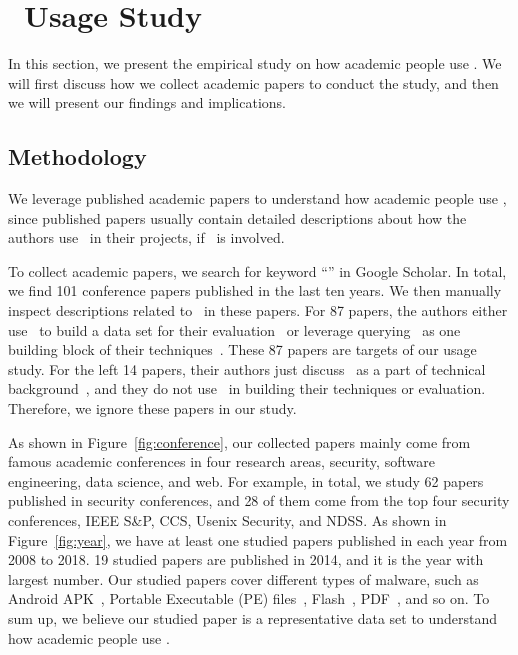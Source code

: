 \section{\vt\ Usage Study}

In this section, we present the empirical study on how 
academic people use \vt. 
We will first discuss how we collect academic papers to conduct the study, 
and then we will present our findings and implications. 

\subsection{Methodology}

We leverage published academic papers to understand 
how academic people use \vt,
since published papers usually contain detailed descriptions 
about how the authors use \vt\ in their projects, if \vt\ is involved. 

To collect academic papers, we search for keyword ``\vt'' in Google Scholar. 
In total, we find 101 conference papers published in the last ten years.
We then manually inspect descriptions related to \vt\ in these papers. 
For 87 papers, the authors either use \vt\ 
to build a data set for their evaluation~\cite{ford2009analyzing,android-1,email-vt-1,kharraz2016unveil} 
or leverage querying \vt\ as one building block of their
techniques~\cite{vt-component-1,vt-component-2,vt-component-3}. 
These 87 papers are targets of our \vt{} usage study. 
For the left 14 papers, their authors just discuss \vt\ as a part 
of technical background~\cite{not-use-1,bayer2009scalable,jiang2012dissecting}, and 
they do not use \vt\ in building their techniques or evaluation. 
Therefore, we ignore these papers in our study. 




As shown in Figure~\ref{fig:conference}, 
our collected papers mainly come from famous academic conferences 
in four research areas, security, software engineering, data science, and web. 
For example, in total, we study 62 papers published in security conferences,
and 28 of them come from the top four security conferences, 
IEEE S\&P, CCS, Usenix Security, and NDSS.
As shown in Figure~\ref{fig:year}, 
we have at least one studied papers 
published in each year from 2008 to 2018. 
19 studied papers are published in 2014, 
and it is the year with largest number. 
Our studied papers cover different types of malware, 
such as Android APK~\cite{android-1,arp2014drebin,huangvt2016bigdata}, 
Portable Executable (PE) files~\cite{bayer2009scalable,pe-vt-1,pe-vt-2}, 
Flash~\cite{ford2009analyzing,wressnegger2017looking}, 
PDF~\cite{pdf-vt-1,carmony2016extract}, and so on. 
To sum up, we believe our studied paper is a representative data set 
to understand how academic people use \vt{}. 

